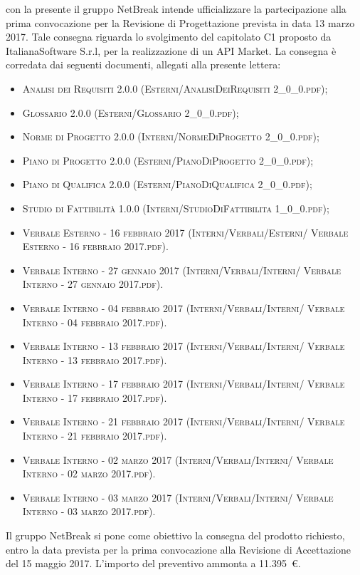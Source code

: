\documentclass[11pt,a4paper]{letter}
\begin{document}
\begin{letter}
\indent con la presente il gruppo NetBreak intende ufficializzare la partecipazione alla prima convocazione per la Revisione di Progettazione prevista in data 13 marzo 2017. Tale consegna riguarda lo svolgimento del capitolato C1 proposto da ItalianaSoftware S.r.l, per la realizzazione di un API Market.
La consegna \`e corredata dai seguenti documenti, allegati alla presente lettera:
\begin{itemize}
	\item \textsc{Analisi dei Requisiti 2.0.0 (Esterni/AnalisiDeiRequisiti 2\_0\_0.pdf)}; 
	\item \textsc{Glossario 2.0.0 (Esterni/Glossario 2\_0\_0.pdf)}; 
	\item \textsc{Norme di Progetto 2.0.0 (Interni/NormeDiProgetto 2\_0\_0.pdf)}; 
	\item \textsc{Piano di Progetto 2.0.0 (Esterni/PianoDiProgetto 2\_0\_0.pdf)}; 
	\item \textsc{Piano di Qualifica 2.0.0 (Esterni/PianoDiQualifica 2\_0\_0.pdf)}; 
	\item \textsc{Studio di Fattibilit\`a 1.0.0 (Interni/StudioDiFattibilita 1\_0\_0.pdf)}; 
	\item \textsc{Verbale Esterno - 16 febbraio 2017 (Interni/Verbali/Esterni/ Verbale Esterno - 16 febbraio 2017.pdf)}. 
	\item \textsc{Verbale Interno - 27 gennaio 2017 (Interni/Verbali/Interni/ Verbale Interno - 27 gennaio 2017.pdf)}. 
	\item \textsc{Verbale Interno - 04 febbraio 2017 (Interni/Verbali/Interni/ Verbale Interno - 04 febbraio 2017.pdf)}. 
	\item \textsc{Verbale Interno - 13 febbraio 2017 (Interni/Verbali/Interni/ Verbale Interno - 13 febbraio 2017.pdf)}. 
	\item \textsc{Verbale Interno - 17 febbraio 2017 (Interni/Verbali/Interni/ Verbale Interno - 17 febbraio 2017.pdf)}. 
	\item \textsc{Verbale Interno - 21 febbraio 2017 (Interni/Verbali/Interni/ Verbale Interno - 21 febbraio 2017.pdf)}. 
	\item \textsc{Verbale Interno - 02 marzo 2017 (Interni/Verbali/Interni/ Verbale Interno - 02 marzo 2017.pdf)}. 
	\item \textsc{Verbale Interno - 03 marzo 2017 (Interni/Verbali/Interni/ Verbale Interno - 03 marzo 2017.pdf)}. 

\end{itemize}
	Il gruppo NetBreak si pone come obiettivo la consegna del prodotto richiesto, entro la data prevista per la prima convocazione alla Revisione di Accettazione del 15 maggio 2017. L'importo del preventivo ammonta a \hbox{11.395 \euro{}.}


\end{letter}
\end{document}
